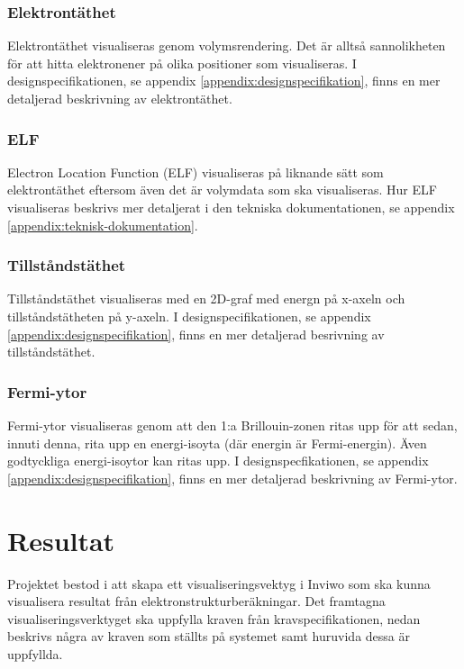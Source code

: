 \documentclass[a4paper,12pt]{article}
\begin{document}
\subsubsection{Elektrontäthet}
Elektrontäthet visualiseras genom volymsrendering. Det är alltså sannolikheten för att hitta elektronener på olika positioner som visualiseras. %
I designspecifikationen, se appendix \ref{appendix:designspecifikation}, finns en mer detaljerad beskrivning av elektrontäthet.

\subsubsection{ELF}
Electron Location Function (ELF) visualiseras på liknande sätt som elektrontäthet eftersom även det är volymdata som ska visualiseras. Hur ELF visualiseras beskrivs mer detaljerat i den tekniska dokumentationen, se appendix \ref{appendix:teknisk-dokumentation}.

\subsubsection{Tillståndstäthet}
Tillståndstäthet visualiseras med en 2D-graf med energn på x-axeln och tillståndstätheten på y-axeln.  %
I designspecifikationen, se appendix \ref{appendix:designspecifikation}, finns en mer detaljerad besrivning av tillståndstäthet.


\subsubsection{Fermi-ytor}
Fermi-ytor visualiseras genom att den 1:a Brillouin-zonen ritas upp för att sedan, innuti denna, rita upp en energi-isoyta (där energin är Fermi-energin). Även godtyckliga energi-isoytor kan ritas upp.  %
I designspecfikationen, se appendix \ref{appendix:designspecifikation},  finns en mer detaljerad beskrivning av Fermi-ytor.


\section{Resultat}
\label{ch:resultat}
Projektet bestod i att skapa ett visualiseringsvektyg i Inviwo som ska kunna visualisera resultat från elektronstrukturberäkningar. Det framtagna visualiseringsverktyget ska uppfylla kraven från kravspecifikationen, nedan beskrivs några av kraven som ställts på systemet samt huruvida dessa är uppfyllda.
\end{document}
